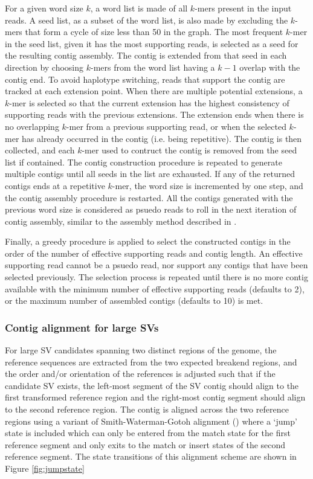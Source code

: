 \documentclass{article}
\begin{document}
For a given word size $k$, a word list is made of all $k$-mers present in the input reads. A seed list, as a subset of the word list, is also made by excluding the $k$-mers that form a cycle of size less than 50 in the graph. The most frequent $k$-mer in the seed list, given it has the most supporting reads, is selected as a seed for the resulting contig assembly. The contig is extended from that seed in each direction by choosing $k$-mers from the word list having a $k-1$ overlap with the contig end. To avoid haplotype switching, reads that support the contig are tracked at each extension point. When there are multiple potential extensions, a $k$-mer is selected so that the current extension has the highest consistency of supporting reads with the previous extensions. The extension ends when there is no overlapping $k$-mer from a previous supporting read, or when the selected $k$-mer has already occurred in the contig (i.e. being repetitive). The contig is then collected, and each $k$-mer used to contruct the contig is removed from the seed list if contained. The contig construction procedure is repeated to generate multiple contigs until all seeds in the list are exhausted. If any of the returned contigs ends at a repetitive $k$-mer, the word size is incremented by one step, and the contig assembly procedure is restarted. All the contigs generated with the previous word size is considered as psuedo reads to roll in the next iteration of contig assembly, similar to the assembly method described in \cite{tigra2014}.

Finally, a greedy procedure is applied to select the constructed contigs in the order of the number of effective supporting reads and contig length. An effective supporting read cannot be a psuedo read, nor support any contigs that have been selected previously. The selection process is repeated until there is no more contig available with the minimum number of effective supporting reads (defaults to 2), or the maximum number of assembled contigs (defaults to 10) is met.

\subsubsection{Contig alignment for large SVs} For large SV candidates spanning two distinct regions of the genome, the reference sequences are extracted from the two expected breakend regions, and the order and/or orientation of the references is adjusted such that if the candidate SV exists, the left-most segment of the SV contig should align to the first transformed reference region and the right-most contig segment should align to the second reference region. The contig is aligned across the two reference regions using a variant of Smith-Waterman-Gotoh alignment (\cite{smith1981,gotoh1982}) where a `jump' state is included which can only be entered from the match state for the first reference segment and only exits to the match or insert states of the second reference segment. The state transitions of this alignment scheme are shown in Figure \ref{fig:jumpstate}
\end{document}
